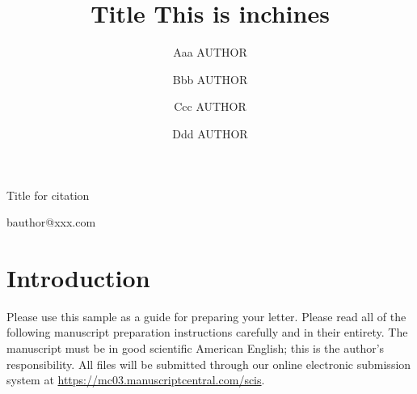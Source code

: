 \documentclass{SCIS2019}
\begin{document}
\Month{}
\Vol{}
\No{}
\DOI{}
\ArtNo{}
\ReceiveDate{}
\ReviseDate{}
\AcceptDate{}
\OnlineDate{}

\title{Title This is inchines
}{Title for citation}

\author[1]{Aaa AUTHOR}{}
\author[1,2]{Bbb AUTHOR}{{bauthor@xxx.com}}
\author[2]{Ccc AUTHOR}{}
\author[3]{Ddd AUTHOR}{}




\address[1]{Affiliation, City {\rm 000000}, Country}
\address[2]{Affiliation, City {\rm 000000}, Country}
\address[3]{Affiliation, City {\rm 000000}, Country}



\maketitle


\section{Introduction}
Please use this sample as a guide for preparing your letter. Please read all of the following manuscript preparation instructions carefully and in their entirety. The manuscript must be in good scientific American English; this is the author's responsibility. All files will be submitted through our online electronic submission system at \url{https://mc03.manuscriptcentral.com/scis}.
\end{document}
